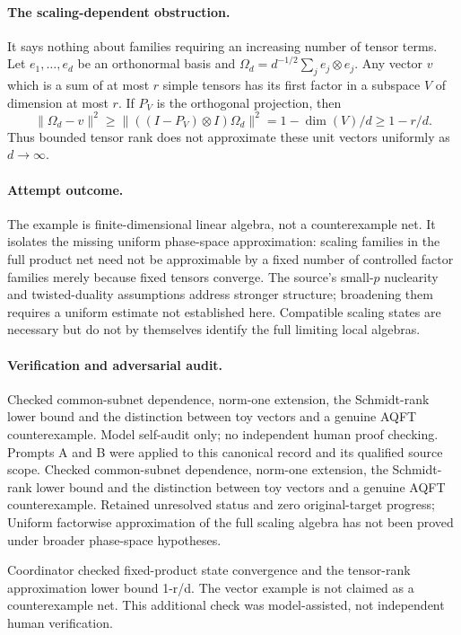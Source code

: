 \documentclass[11pt]{article}
\begin{document}
\paragraph{The scaling-dependent obstruction.} It says nothing about families requiring an increasing number of tensor terms. Let $e_1,\ldots,e_d$ be an orthonormal basis and $\Omega_d=d^{-1/2}\sum_je_j\otimes e_j$. Any vector $v$ which is a sum of at most $r$ simple tensors has its first factor in a subspace $V$ of dimension at most $r$. If $P_V$ is the orthogonal projection, then
\[
 \|\Omega_d-v\|^2\geq\|((I-P_V)\otimes I)\Omega_d\|^2
 =1-\dim(V)/d\geq1-r/d.
\]
Thus bounded tensor rank does not approximate these unit vectors uniformly as $d\to\infty$.

\paragraph{Attempt outcome.} The example is finite-dimensional linear algebra, not a counterexample net. It isolates the missing uniform phase-space approximation: scaling families in the full product net need not be approximable by a fixed number of controlled factor families merely because fixed tensors converge. The source's small-$p$ nuclearity and twisted-duality assumptions address stronger structure; broadening them requires a uniform estimate not established here. Compatible scaling states are necessary but do not by themselves identify the full limiting local algebras.

\paragraph{Verification and adversarial audit.}
Checked common-subnet dependence, norm-one extension, the Schmidt-rank lower bound and the distinction between toy vectors and a genuine AQFT counterexample. Model self-audit only; no independent human proof checking. Prompts A and B were applied to this canonical record and its qualified source scope. Checked common-subnet dependence, norm-one extension, the Schmidt-rank lower bound and the distinction between toy vectors and a genuine AQFT counterexample. Retained unresolved status and zero original-target progress; Uniform factorwise approximation of the full scaling algebra has not been proved under broader phase-space hypotheses.

Coordinator checked fixed-product state convergence and the tensor-rank approximation lower bound 1-r/d. The vector example is not claimed as a counterexample net. This additional check was model-assisted, not independent human verification.
\end{document}
